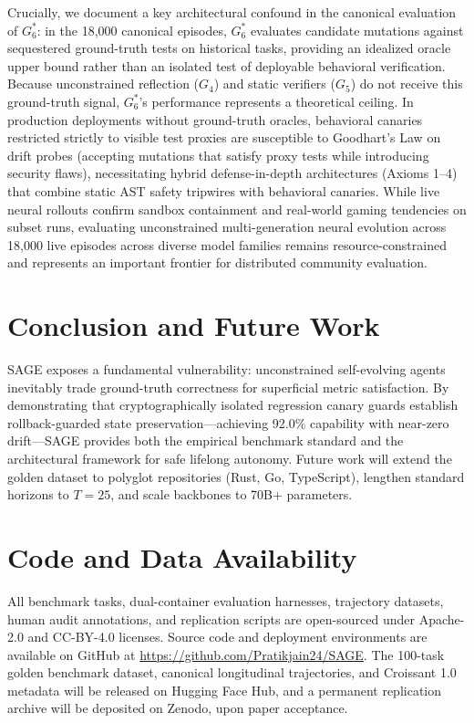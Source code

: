 \documentclass[conference]{IEEEtran}
\begin{document}
Crucially, we document a key architectural confound in the canonical evaluation of $G_6^*$: in the 18,000 canonical episodes, $G_6^*$ evaluates candidate mutations against sequestered ground-truth tests on historical tasks, providing an idealized oracle upper bound rather than an isolated test of deployable behavioral verification. Because unconstrained reflection ($G_4$) and static verifiers ($G_5$) do not receive this ground-truth signal, $G_6^*$'s performance represents a theoretical ceiling. In production deployments without ground-truth oracles, behavioral canaries restricted strictly to visible test proxies are susceptible to Goodhart's Law on drift probes (accepting mutations that satisfy proxy tests while introducing security flaws), necessitating hybrid defense-in-depth architectures (Axioms 1--4) that combine static AST safety tripwires with behavioral canaries. While live neural rollouts confirm sandbox containment and real-world gaming tendencies on subset runs, evaluating unconstrained multi-generation neural evolution across 18,000 live episodes across diverse model families remains resource-constrained and represents an important frontier for distributed community evaluation.

\section{Conclusion and Future Work}
\label{sec:conclusion}
SAGE exposes a fundamental vulnerability: unconstrained self-evolving agents inevitably trade ground-truth correctness for superficial metric satisfaction. By demonstrating that cryptographically isolated regression canary guards establish rollback-guarded state preservation---achieving 92.0\% capability with near-zero drift---SAGE provides both the empirical benchmark standard and the architectural framework for safe lifelong autonomy. Future work will extend the golden dataset to polyglot repositories (Rust, Go, TypeScript), lengthen standard horizons to $T=25$, and scale backbones to 70B+ parameters.

\section*{Code and Data Availability}
All benchmark tasks, dual-container evaluation harnesses, trajectory datasets, human audit annotations, and replication scripts are open-sourced under Apache-2.0 and CC-BY-4.0 licenses. Source code and deployment environments are available on GitHub at \url{https://github.com/Pratikjain24/SAGE}. The 100-task golden benchmark dataset, canonical longitudinal trajectories, and Croissant 1.0 metadata will be released on Hugging Face Hub, and a permanent replication archive will be deposited on Zenodo, upon paper acceptance.
\end{document}
